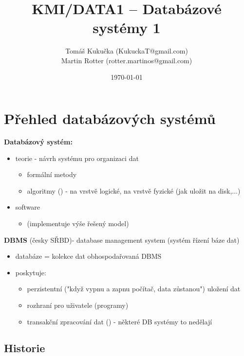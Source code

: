 \documentclass[10pt, a4paper, titlepage]{article}
\title{KMI/DATA1  -- Databázové systémy 1}
\author{Tomáš Kukučka (KukuckaT@gmail.com)\\Martin Rotter (rotter.martinos@gmail.com)}
\date{\today}
\theoremstyle{note}
\begin{document}
\maketitle

\section{Přehled databázových systémů}
\textbf{Databázový systém:}
\begin{itemize}
	\item teorie - návrh systému pro organizaci dat
	\begin{itemize}
		\item formální metody
		\item algoritmy () - na vrstvě logické, na vrstvě fyzické (jak uložit na disk,...)
	\end{itemize}
	\item software
	\begin{itemize}
		\item {} (implementuje výše řešený model)
	\end{itemize}
\end{itemize}

\textbf{DBMS} (česky SŘBD)- database management system (systém řízení báze dat)
\begin{itemize}	
	\item databáze = kolekce dat obhospodařovaná DBMS
	\item poskytuje:
	\begin{itemize}
		\item perzistentní ("když vypnu a zapnu počítač, data zůstanou") uložení dat
		\item rozhraní pro uživatele (programy)
		\item transakční zpracování dat () - některé DB systémy to nedělají
	\end{itemize}
\end{itemize}		 


\subsection{Historie}
\end{document}
